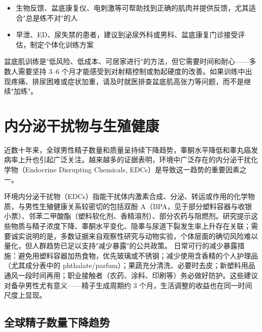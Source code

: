 \begin{itemize}[leftmargin=2cm]
	\item 生物反馈、盆底康复仪、电刺激等可帮助找到正确的肌肉并提供反馈，尤其适合"总是练不对"的人
	\item 早泄、ED、尿失禁的患者，建议到泌尿外科或男科、盆底康复门诊接受评估，制定个体化训练方案
\end{itemize}

\begin{tcolorbox}[colback=pink!5!white,colframe=red!50!black,title=贴心小叮咛]
盆底肌训练是"低风险、低成本、可居家进行"的方法，但它需要时间和耐心——多数人需要坚持 3--6 个月才能感受到对射精控制或勃起硬度的改善。如果训练中出现疼痛、排尿困难或症状加重，请及时就医排查盆底肌高张力等问题，而不是继续"加练"。
\end{tcolorbox}


\section{内分泌干扰物与生殖健康}

近数十年来，全球男性精子数量和质量呈持续下降趋势，睾酮水平降低和睾丸癌发病率上升也引起广泛关注。越来越多的证据表明，环境中广泛存在的内分泌干扰化学物（Endocrine Disrupting Chemicals, EDCs）是导致这一趋势的重要因素之一。


环境内分泌干扰物（EDCs）指能干扰体内激素合成、分泌、转运或作用的化学物质，与男性生殖健康关系较密切的包括双酚 A（BPA，见于部分塑料容器与收银小票）、邻苯二甲酸酯（塑料软化剂、香精溶剂）、部分农药与阻燃剂。研究提示这些物质与精子浓度下降、睾酮水平变化、隐睾与尿道下裂发生率上升存在关联；需要诚实说明的是，多数证据来自观察性研究与动物实验，个体层面的确切风险难以量化，但人群趋势已足以支持"减少暴露"的公共政策。
日常可行的减少暴露措施：避免用塑料容器加热食物，优先玻璃或不锈钢；减少使用含香精的个人护理品（尤其成分表中的 phthalate/parfum）；果蔬充分清洗、必要时去皮；新塑料用品通风一段时间再用；职业接触者（农药、涂料、印刷等）务必做好防护。这些建议对备孕男性尤有意义——精子生成周期约 3 个月，生活调整的收益也在同一时间尺度上显现。

\subsection{全球精子数量下降趋势}

